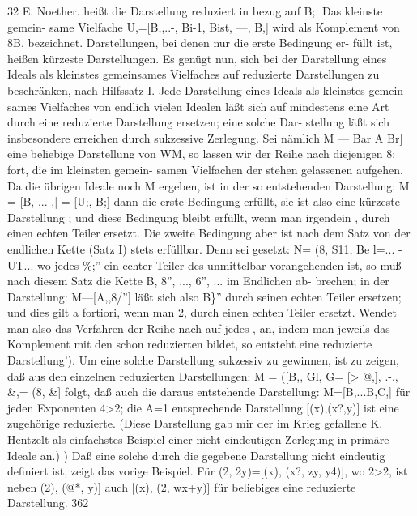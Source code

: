 \documentclass[11pt,a4paper]{article}
\theoremstyle{plain}
\theoremstyle{definition}
\begin{document}
32 
E. Noether. 
heißt die Darstellung reduziert in bezug auf B;. 
Das kleinste gemein- 
same Vielfache U,=[B,,..-, Bi-1, Bist, ---, B,] wird als Komplement 
von 8B, bezeichnet. 
Darstellungen, bei denen nur die erste Bedingung er- 
füllt ist, heißen kürzeste Darstellungen. 
Es genügt nun, 
sich bei der Darstellung 
eines Ideals als kleinstes 
gemeinsames Vielfaches auf reduzierte Darstellungen zu beschränken, nach 
Hilfssatz I. Jede Darstellung 
eines Ideals als kleinstes gemein- 
sames Vielfaches 
von 
endlich 
vielen Idealen 
läßt sich auf mindestens 
eine Art durch eine reduzierte Darstellung 
ersetzen; 
eine solche Dar- 
stellung läßt sich insbesondere erreichen durch sukzessive Zerlegung. 
Sei nämlich M --- Bar A Br] eine beliebige Darstellung von WM, so 
lassen wir der Reihe nach diejenigen 8; fort, 
die im kleinsten gemein- 
samen Vielfachen der stehen gelassenen aufgehen. 
Da die übrigen Ideale 
noch M ergeben, ist in der so entstehenden Darstellung: 
M = [B, ... ,| = [U;, B;] 
dann die erste Bedingung erfüllt, 
sie ist also eine kürzeste Darstellung ; 
und diese Bedingung bleibt erfüllt, 
wenn man 
irgendein , durch einen 
echten Teiler ersetzt. 
Die zweite Bedingung aber ist nach dem Satz von 
der endlichen Kette (Satz I) stets erfüllbar. 
Denn sei gesetzt: 
N= (8, S11, 
Be l=... - 
UT... 
wo jedes \%;'' ein echter 
Teiler des unmittelbar vorangehenden ist, so 
muß nach diesem Satz die Kette B, 8'', ..., 6'', ... im Endlichen ab- 
brechen; 
in der Darstellung: 
M---[A,,8/''] 
läßt sich also B\}'' durch 
seinen echten Teiler ersetzen; und dies gilt a fortiori, wenn man 2, durch 
einen echten Teiler ersetzt. 
Wendet man 
also das Verfahren der Reihe 
nach auf jedes , an, indem man jeweils das Komplement mit den schon 
reduzierten  bildet, so entsteht eine reduzierte Darstellung'). 
Um eine solche Darstellung sukzessiv 
zu gewinnen, 
ist zu zeigen, 
daß aus den einzelnen reduzierten Darstellungen: 
M = ([B,, Gl, G= [> @,], .-., \&,= (8, \&] 
folgt, daß auch die daraus entstehende Darstellung: 
M=[B,...B,C,] 
für jeden Exponenten 4>2; 
die A=1 
entsprechende Darstellung 
[(x),(x?,y)] 
ist 
eine 
zugehörige 
reduzierte. 
(Diese Darstellung 
gab mir der im Krieg gefallene 
K. Hentzelt als einfachstes Beispiel einer 
nicht eindeutigen Zerlegung 
in primäre 
Ideale an.) 
) Daß eine solche durch die gegebene Darstellung nicht eindeutig definiert ist, 
zeigt das vorige Beispiel. 
Für 
(2\textdegree{}, 2y)=[(x), (x?, zy, y4)], wo 2>2, 
ist neben 
(2), (@*, y)] auch [(x), (2\textdegree{}, wx+y)] für beliebiges \guillemotleft{} eine reduzierte Darstellung. 
362
\end{document}
